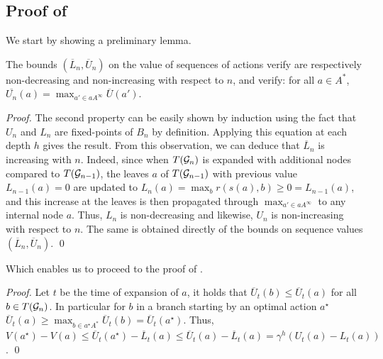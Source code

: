\documentclass[runningheads]{llncs}
\begin{document}
\subsection{Proof of }

We start by showing a preliminary lemma.
\begin{lemma}
	\label{lem:bounds}
	The bounds $(\overline{L}_n, \overline{U}_n)$ on the value of sequences of actions verify are respectively non-decreasing and non-increasing with respect to $n$, and verify: for all $a\in A^*$, $\overline{U_n}(a) = \max_{a'\in a A^\infty} \overline{U}(a')$.
\end{lemma}
\begin{proof}
	The second property can be easily shown by induction using the fact that $U_n$ and $L_n$ are fixed-points of $B_n$ by definition. Applying this equation at each depth $h$ gives the result. From this observation, we can deduce that $\overline{L}_n$ is increasing with $n$. Indeed, since when $T(\mathcal{G}_n)$ is expanded with additional nodes compared to $T(\mathcal{G}_{n-1})$, the leaves $a$ of $T(\mathcal{G}_{n-1})$ with previous value $L_{n-1}(a)=0$ are updated to $L_n(a) = \max_b r(s(a), b) \geq 0 = L_{n-1}(a)$, and this increase at the leaves is then propagated through $\max_{a'\in a A^\infty}$ to any internal node $a$. Thus, $L_n$ is non-decreasing and likewise, $U_n$ is non-increasing with respect to $n$. The same is obtained directly of the bounds on sequence values $(\overline{L}_n, \overline{U}_n)$.
\qed\end{proof}

Which enables us to proceed to the proof of .
\begin{proof}
	Let $t$ be the time of expansion of $a$, it holds that $\overline{U}_t(b) \leq \overline{U}_t(a)$ for all $b\in T(\mathcal{G}_n)$. In particular for $b$ in a branch starting by an optimal action $a^\star$ $\overline{U}_t(a) \geq \max_{b\in a^\star A^*}  \overline{U}_t(b) = \overline{U}_t(a^\star)$. Thus, $V(a^\star)-V(a) \leq \overline{U}_t(a^\star) - \overline{L}_t(a) \leq \overline{U}_t(a) - \overline{L}_t(a) = \gamma^h(U_t(a)-L_t(a))$.
\qed\end{proof}
\end{document}
